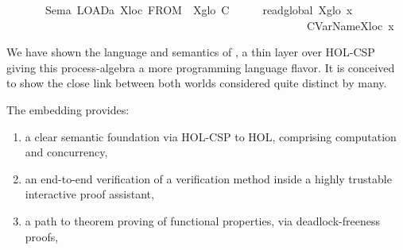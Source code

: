 \begin{isabellebody}
\ \ \ \ \ \ \ {\isacharbar}{\kern0pt}{\isacartoucheopen}Sem\isactrlsub a\ {\isacharparenleft}{\kern0pt}LOAD\isactrlsub a\ X\isactrlsub l\isactrlsub o\isactrlsub c\ FROM\ \ X\isactrlsub g\isactrlsub l\isactrlsub o{\isacharparenright}{\kern0pt}\ C\ \ \ {\isacharequal}{\kern0pt}\ {\isacharparenleft}{\kern0pt}{\isasymlambda}\ {\isasymsigma}{\isachardot}{\kern0pt}\ {\isacharparenleft}{\kern0pt}read\isactrlsub g\isactrlsub l\isactrlsub o\isactrlsub b\isactrlsub a\isactrlsub l\ {\isacharparenleft}{\kern0pt}X\isactrlsub g\isactrlsub l\isactrlsub o\ {\isasymsigma}{\isacharparenright}{\kern0pt}{\isacharparenright}{\kern0pt}\isactrlbold {\isacharquery}{\kern0pt}x\isanewline
\ \ \ \ \ \ \ \ \ \ \ \ \ \ \ \ \ \ \ \ \ \ \ \ \ \ \ \ \ \ \ \ \ \ \ \ \ \ \ \ \ \ \ \ \ \ \ \ \ \ \ \ \ {\isasymrightarrow}\ C{\isacharparenleft}{\kern0pt}{\isasymsigma}{\isacharparenleft}{\kern0pt}{\isacharparenleft}{\kern0pt}VarName{\isacharparenleft}{\kern0pt}X\isactrlsub l\isactrlsub o\isactrlsub c\ {\isasymsigma}{\isacharparenright}{\kern0pt}{\isacharparenright}{\kern0pt}{\isacharcolon}{\kern0pt}{\isacharequal}{\kern0pt}x{\isacharparenright}{\kern0pt}{\isacharparenright}{\kern0pt}{\isacharparenright}{\kern0pt}{\isacartoucheclose}%
\isadelimdocument
%
\endisadelimdocument
%
\isatagdocument
%
\isamarkuptrue%
%
\endisatagdocument
{\isafolddocument}%
%
\isadelimdocument
%
\endisadelimdocument
%
\begin{isamarkuptext}%
We have shown the language and semantics of , a thin layer over HOL-CSP
giving this process-algebra a more programming language flavor. It is conceived to 
show the close link between both worlds considered quite distinct by many.

The embedding provides:

%
\begin{enumerate}%
\item a clear semantic foundation via HOL-CSP to HOL,
comprising  computation and concurrency, 

\item an end-to-end verification of a verification method inside 
a highly trustable interactive proof assistant, 

\item a path to theorem proving of functional properties,
via deadlock-freeness proofs,


\end{enumerate}
\end{isamarkuptext}
\end{isabellebody}
